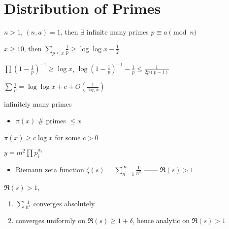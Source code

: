 \section{Distribution of Primes}\label{sec:distribution-of-primes}

\begin{thm}
    $n > 1$, $(n, a) = 1$, then $\exists$ infinite many primes $p \equiv a \pmod{n}$
\end{thm}

\begin{prop}
    $x \geq 10$, then $\sum_{p \leq x} \frac{1}{p} \geq \log \log x - \frac{1}{2}$
\end{prop}
\begin{pf}
    $\prod (1 - \frac{1}{p})^{-1} \geq \log x$, $\log(1 - \frac{1}{p})^{-1} - \frac{1}{p} \leq \frac{1}{2p(p-1)}$
\end{pf}

\begin{fact}
    $\sum \frac{1}{p} = \log \log x + c + O(\frac{1}{\log x})$
\end{fact}

\begin{cor}
    infinitely many primes
\end{cor}

\begin{itemize}
    \item $\pi(x)$ \dash $\#$ primes $\leq x$
\end{itemize}

\begin{prop}
    $\pi(x) \geq c \log x$ for some $c > 0$
\end{prop}
\begin{pf}
    $y = m^{2}\prod p_i^{\alpha_i}$
\end{pf}

\begin{itemize}
    \item Riemann zeta function $\zeta(s) = \sum_{n=1}^\infty \frac{1}{n^s}$ ------ $\Re(s) > 1$
\end{itemize}

\begin{lemma}
    $\Re(s) > 1$,
    \begin{enumerate}
        \item $\sum \frac{1}{n^s}$ converges absolutely
        \item converges uniformly on $\Re(s) \geq 1 + \delta$, hence analytic on $\Re(s) > 1$
    \end{enumerate}
\end{lemma}

